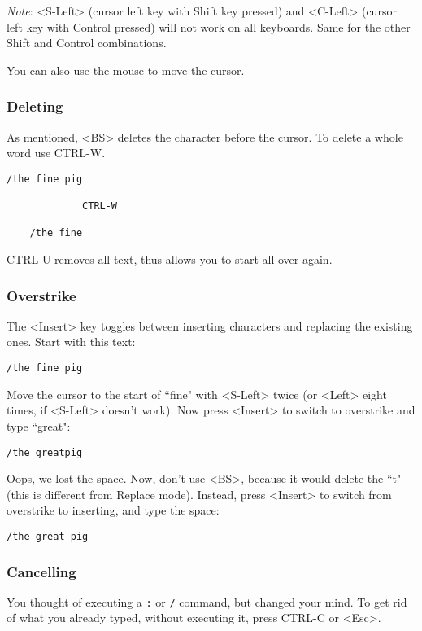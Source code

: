 \emph{Note}:
<S-Left> (cursor left key with Shift key pressed) and <C-Left> (cursor left key with Control pressed) will not work on all keyboards.
Same for the other Shift and Control combinations.

You can also use the mouse to move the cursor.
\subsubsection{Deleting}
As mentioned, <BS> deletes the character before the cursor.  To delete a whole
word use CTRL-W.

\begin{Verbatim}[samepage=true]
    /the fine pig

             CTRL-W

    /the fine
\end{Verbatim}

CTRL-U removes all text, thus allows you to start all over again.
\subsubsection{Overstrike}
The <Insert> key toggles between inserting characters and replacing the existing ones.
Start with this text:

\begin{Verbatim}[samepage=true]
    /the fine pig
\end{Verbatim}

Move the cursor to the start of ``fine" with <S-Left> twice (or <Left> eight times, if <S-Left> doesn't work).
Now press <Insert> to switch to overstrike and type ``great":

\begin{Verbatim}[samepage=true]
    /the greatpig
\end{Verbatim}

Oops, we lost the space.
Now, don't use <BS>, because it would delete the ``t" (this is different from Replace mode).
Instead, press <Insert> to switch from overstrike to inserting, and type the space:

\begin{Verbatim}[samepage=true]
    /the great pig
\end{Verbatim}

\subsubsection{Cancelling}
You thought of executing a \texttt{:} or \texttt{/} command, but changed your mind.
To get rid of what you already typed, without executing it, press CTRL-C or <Esc>.

